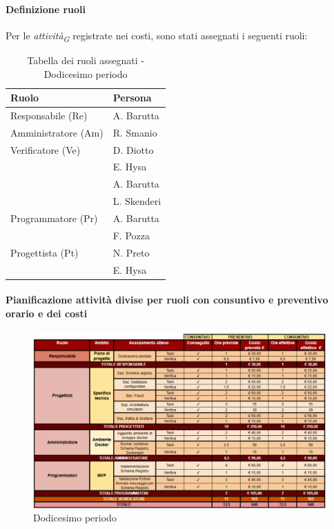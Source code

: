 \paragraph{Definizione ruoli}
Per le \textit{attività}\textsubscript{\textit{G}} registrate nei costi, sono stati assegnati i seguenti ruoli: 

\begin{table}[H]
    \centering
    \begin{tabular}{|L{4cm}|L{2cm}|}
        \hline
        \textbf{Ruolo} & \textbf{Persona} \\
        \hline
        \hline
        Responsabile (Re)   & A. Barutta \\
        \hline
        Amministratore (Am) & R. Smanio \\
        \hline
        Verificatore (Ve)   & D. Diotto \\
                            & E. Hysa \\
                            & A. Barutta \\
                            & L. Skenderi \\ 
        \hline
        Programmatore (Pr)  & A. Barutta \\
                            & F. Pozza \\
        \hline
        Progettista (Pt)    & N. Preto \\
                            & E. Hysa \\
        \hline
    \end{tabular}
    \caption{Tabella dei ruoli assegnati - Dodicesimo periodo}
    \label{tab:Ruoli_persone_12}
\end{table}

\paragraph{Pianificazione attività divise per ruoli con consuntivo e preventivo orario e dei costi}

\vspace{0.4cm}

\begin{figure}[H]
    \centering
    \includegraphics[height=0.6\textwidth]{../Images/periodo12.jpeg}
    \caption{Dodicesimo periodo}
    \label{fig:Dodicesimo_periodo}
\end{figure}


